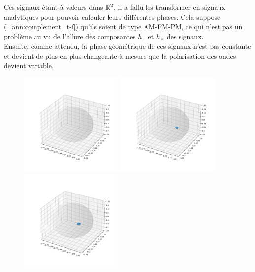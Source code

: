 Ces signaux étant à valeurs dans $\mathbb{R}^2$, il a fallu les transformer en signaux analytiques pour pouvoir calculer leurs différentes phases. Cela suppose (\cf~\ref{ann:complement_t-f}) qu'ils soient de type AM-FM-PM, ce qui n'est pas un problème au vu de l'allure des composantes $h_+$ et $h_\times$ des signaux.
\\
Ensuite, comme attendu, la phase géométrique de ces signaux n'est pas constante et devient de plus en plus changeante à mesure que la polarisation des ondes devient variable.
\\

\begin{figure}[h]
	\includegraphics[width=0.45\textwidth]{fig/part-3/GW_proj_full1.pdf} \hfill	
	\includegraphics[width=0.45\textwidth]{fig/part-3/GW_proj_full2.pdf} \\
	\includegraphics[width=0.45\textwidth]{fig/part-3/GW_proj_full3.pdf} \hfill

\end{figure}
